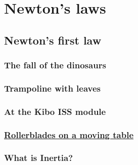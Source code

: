 \documentclass[
  letterpaper,
  DIV=11,
  numbers=noendperiod]{scrreprt}
\begin{document}
\chapter*{Newton's laws}\label{newtons-laws}


\section*{Newton's first law}\label{newtons-first-law}


\subsection*{The fall of the dinosaurs}\label{the-fall-of-the-dinosaurs}

\subsection*{Trampoline with leaves}\label{trampoline-with-leaves}

\subsection*{At the Kibo ISS module}\label{at-the-kibo-iss-module}

\subsection*{\texorpdfstring{\href{https://youtu.be/wUeSW0rUkao?t=174}{Rollerblades
on a moving
table}}{Rollerblades on a moving table}}\label{rollerblades-on-a-moving-table}

\subsection*{What is Inertia?}\label{what-is-inertia}
\end{document}
